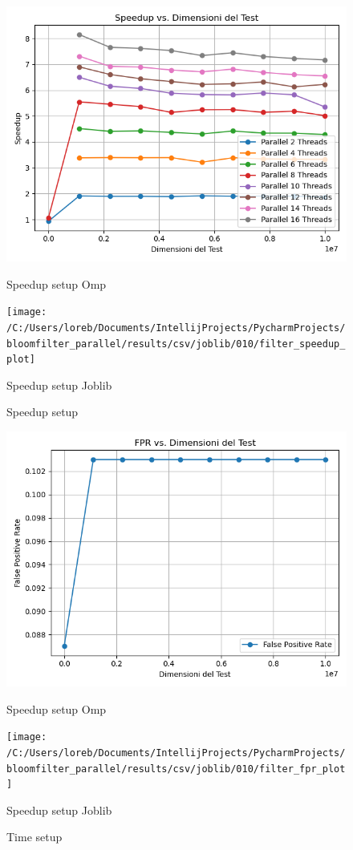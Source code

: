 \documentclass[11pt]{article}
\begin{document}
    \begin{figure}[H]
        \centering
        \includegraphics[width=\linewidth]{omp/010/filter_speedup_plot}
            \caption{Speedup setup Omp}\label{fig:010-filter_speedup_omp}
        \endminipage\hfill
        \texttt{[image: /C:/Users/loreb/Documents/IntellijProjects/PycharmProjects/bloomfilter\_parallel/results/csv/joblib/010/filter\_speedup\_plot]}
            \caption{Speedup setup Joblib}\label{fig:010-filter_speedup_joblib}
        \endminipage\hfill
        \caption{Speedup setup}
    \end{figure}
    \begin{figure}[H]
        \centering
        \includegraphics[width=\linewidth]{omp/010/filter_fpr_plot}
            \caption{Speedup setup Omp}\label{fig:010-filter_fpr_omp}
        \endminipage\hfill
        \texttt{[image: /C:/Users/loreb/Documents/IntellijProjects/PycharmProjects/bloomfilter\_parallel/results/csv/joblib/010/filter\_fpr\_plot]}
            \caption{Speedup setup Joblib}\label{fig:010-filter_fpr_joblib}
        \endminipage\hfill
        \caption{Time setup}
    \end{figure}
\end{document}
